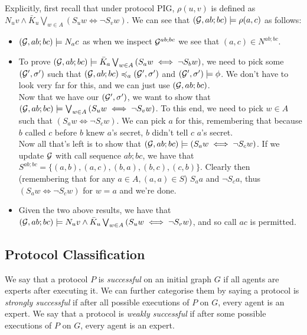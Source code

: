 \documentclass[12pt, a4paper]{article} %
\begin{document}
Explicitly, first recall that under protocol \textsf{PIG}, $\rho(u, v)$ is defined as $N_u v \land \bar{K}_u \bigvee_{w \in A} \left(S_u w \iff \neg S_v w\right)$. We can see that $(\mathcal{G}, ab;bc) \models \rho(a, c)$ as follows:

\begin{itemize}
    \item $(\mathcal{G}, ab;bc) \models N_a c$ as when we inspect $\mathcal{G}^{ab;bc}$ we see that $(a, c) \in N^{ab;bc}$.
    \item To prove $(\mathcal{G}, ab;bc) \models \bar{K}_a \bigvee_{w \in A} \left(S_a w \iff \neg S_b w\right)$, we need to pick some $(\mathcal{G}', \sigma')$ such that $\left(\mathcal{G}, ab;bc\right) \preccurlyeq_a \left(\mathcal{G}', \sigma'\right)$ and $\left(\mathcal{G}', \sigma'\right) \models \phi$. We don't have to look very far for this, and we can just use $\left(\mathcal{G}, ab;bc\right)$. \\
    Now that we have our $(\mathcal{G}', \sigma')$, we want to show that $(\mathcal{G}, ab;bc) \models \bigvee_{w \in A} \left(S_u w \iff \neg S_v w\right)$. To this end, we need to pick $w \in A$ such that $\left(S_a w \iff \neg S_c w\right)$. We can pick $a$ for this, remembering that because $b$ called $c$ before $b$ knew $a$'s secret, $b$ didn't tell $c$ $a$'s secret. \\
    Now all that's left is to show that $(\mathcal{G}, ab;bc) \models \left(S_a w \iff \neg S_c w\right)$. If we update $\mathcal{G}$ with call sequence $ab; bc$, we have that $S^{ab;bc} = \{(a, b), (a, c), (b, a), (b, c), (c, b)\}$. Clearly then (remembering that for any $a \in A, (a, a) \in S$) $S_a a$ and $\neg S_c a$, thus $\left(S_a w \iff \neg S_c w\right)$ for $w = a$ and we're done. 
    \item Given the two above results, we have that $(\mathcal{G}, ab;bc) \models N_u v \land \bar{K}_u \bigvee_{w \in A} \left(S_u w \iff \neg S_v w\right)$, and so call $ac$ is permitted.
\end{itemize}

\subsection{Protocol Classification}

We say that a protocol $P$ is \textit{successful} on an initial graph $G$ if all agents are experts after executing it. We can further categorise them by saying a protocol is \textit{strongly successful} if after all possible executions of $P$ on $G$, every agent is an expert. We say that a protocol is \textit{weakly successful} if after some possible executions of $P$ on $G$, every agent is an expert. 
\end{document}
